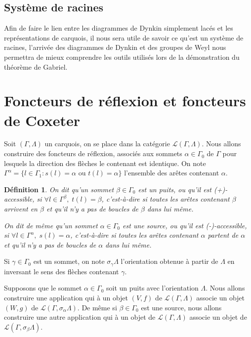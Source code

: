 \documentclass[a4paper,11pt]{article}
\newtheorem{defi}[thm]{Définition}%
\begin{document}
\subsection{Système de racines}
Afin de faire le lien entre les diagrammes de Dynkin simplement lacés et les représentations de carquois, il nous sera utile de savoir ce qu'est un système de racines, l'arrivée des diagrammes de Dynkin et des groupes de Weyl nous permettra de mieux comprendre les outils utilisés lors de la démonstration du théorème de Gabriel.

\clearpage
\section{Foncteurs de réflexion et foncteurs de Coxeter}
Soit $(\Gamma,\Lambda)$ un carquois, on se place dans la catégorie $\mathscr{L}(\Gamma,\Lambda)$. Nous allons construire des foncteurs de réflexion, associés aux sommets $\alpha \in \Gamma_{0}$ de $\Gamma$ pour lesquels la direction des flèches le contenant est identique. On note $\Gamma^{\alpha}=\{ l\in \Gamma_{1} : s(l)=\alpha\text{ ou }t(l)=\alpha\}$ l'ensemble des arêtes contenant $\alpha$.

\begin{defi}
	On dit qu'un sommet $\beta \in \Gamma_{0}$ est un \emph{puits}, ou qu'il est (+)-accessible, si $\forall l \in \Gamma^{\beta},\; t(l)=\beta$, c'est-à-dire si toutes les arêtes contenant $\beta$ arrivent en $\beta$ et qu'il n'y a pas de boucles de $\beta$ dans lui même.

	On dit de même qu'un sommet $\alpha \in \Gamma_{0}$ est une \emph{source}, ou qu'il est (-)-accessible, si $\forall l \in \Gamma^{\alpha},\; s(l)=\alpha$, c'est-à-dire si toutes les arêtes contenant $\alpha$ partent de $\alpha$ et qu'il n'y a pas de boucles de $\alpha$ dans lui même.
\end{defi}


Si $\gamma \in \Gamma_0$ est un sommet, on note $\sigma_{\gamma}\Lambda$ l'orientation obtenue à partir de $\Lambda$ en inversant le sens des flèches contenant $\gamma$.

Supposons que le sommet $\alpha \in \Gamma_{0}$ soit un puits avec l'orientation $\Lambda$.  Nous allons construire une application qui à un objet $(V,f)$ de $\mathscr{L}(\Gamma,\Lambda)$ associe un objet $(W,g)$ de $\mathscr{L}(\Gamma,\sigma_{\alpha}\Lambda)$. De même si $\beta \in \Gamma_0$ est une source, nous allons construire une autre application qui à un objet de $\mathscr L(\Gamma,\Lambda)$ associe un objet de $\mathscr L(\Gamma,\sigma_{\beta}\Lambda)$. 
\end{document}
